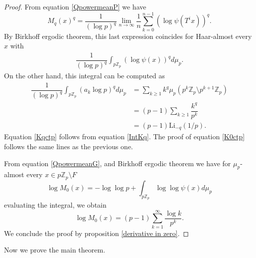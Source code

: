 \documentclass[11pt]{amsart}
\theoremstyle{remark}
\numberwithin{equation}{section}
\newcommand{\Z}{\mathbb{Z}}
\newcommand{\Li}{\mathrm{Li}}
\begin{document}
\begin{proof}
    From equation \eqref{QpowermeanP} we have
    \[M_q(x)^q=\dfrac{1}{(\log p)^q}\lim_{n\to \infty}\dfrac{1}{n}\sum_{k=0}^{n-1}(\log \psi (T^ix))^q. \]
    By Birkhoff ergodic theorem, this last expression coincides for Haar-almost every $x$ with
    \begin{align}\label{IntKq}
        \dfrac{1}{(\log p)^q}\int_{p\Z_p} (\log \psi(x))^q d\mu_p.
    \end{align}
    On the other hand, this integral can be computed as 
    \begin{align*}
        \dfrac{1}{(\log p)^q}\int_{p\Z_p} (a_k\log p)^q d\mu_p&=\sum_{k\geq 1}k^q \mu_p \left(p^k\Z_p \setminus p^{k+1}\Z_p \right)\\
        &=(p-1)\sum_{k\geq 1}\dfrac{k^q}{p^k}\\
        &=(p-1)\Li_{-q}(1/p).
    \end{align*}
Equation \eqref{Kqctp} follows from equation \eqref{IntKq}. The proof of equation \eqref{K0ctp} follows the same lines as the previous one.

From equation \eqref{QpowermeanG}, and Birkhoff ergodic theorem we have for $\mu_p$-almost every $x\in p\Z_p\setminus F$
 \[\log M_0(x)=-\log \log p +\int_{p\Z_p} \log \log \psi(x)d\mu_p\]
 evaluating the integral, we obtain
 \[\log M_0(x)=(p-1)\sum_{k=1}^\infty \dfrac{\log k}{p^k}.\]
 We conclude the proof by proposition \ref{derivative in zero}.
\end{proof}

Now we prove the main theorem.
\end{document}
